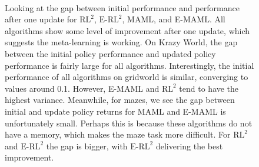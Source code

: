\documentclass{article} %
\begin{document}
\begin{figure}[h!]
\begin{center}
\\
\hfill
{}
\end{center}
\caption{Looking at the gap between initial performance and performance after one update for $\text{RL}^2$, $\text{E-RL}^2$, MAML, and E-MAML. All algorithms show some level of improvement after one update, which suggests the meta-learning is working. On Krazy World, the gap between the initial policy performance and updated policy performance is fairly large for all algorithms. Interestingly, the initial performance of all algorithms on gridworld is similar, converging to values around 0.1. However, E-MAML and $\text{RL}^2$ tend to have the highest variance. Meanwhile, for mazes, we see the gap between initial and update policy returns for MAML and E-MAML is unfortunately small. Perhaps this is because these algorithms do not have a memory, which makes the maze task more difficult. For $\text{RL}^2$ and $\text{E-RL}^2$ the gap is bigger, with $\text{E-RL}^2$ delivering the best improvement.}
\label{fig:gaps}
\end{figure} 
\end{document}
